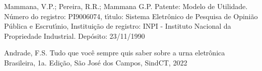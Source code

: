 \documentclass[
12pt,		%
openright,	%
twoside,  %
a4paper,			%
chapter=TITLE,		%
english,			%
french,				%
spanish,			%
brazil				%
]{USPSC-classe/USPSC}
\begin{document}
\begin{flushleft}
\begin{flushleft}
\begin{flushleft}
\begin{flushleft}
\begin{flushleft}
\begin{flushleft}
\begin{flushleft}
\begin{flushleft}
\begin{flushleft}
[MAMMANA et al., 1990] Mammana, V.P.; Pereira, R.R.; Mammana G.P. Patente: Modelo de Utilidade. N\'umero do registro: PI9006074, t\'{\i}tulo: \textquotedbl Sistema Eletr\^onico de Pesquisa de Opini\~ao P\'ublica e Escrut\'{\i}nio\textquotedbl  , Institui\c{c}\~ao de registro: INPI - Instituto Nacional da Propriedade Industrial. Dep\'osito: 23/11/1990
\end{flushleft}


\end{flushleft}


\end{flushleft}


\end{flushleft}


\end{flushleft}


\end{flushleft}


\end{flushleft}


\end{flushleft}


\end{flushleft}


\begin{flushleft}
\begin{flushleft}
\begin{flushleft}
\begin{flushleft}
\begin{flushleft}
\begin{flushleft}
\begin{flushleft}
\begin{flushleft}
\begin{flushleft}
[ANDRADE, 2022] Andrade, F.S. Tudo que voc\^e sempre quis saber sobre a urna eletr\^onica Brasileira, 1a. Edi\c{c}\~ao, S\~ao Jos\'e dos Campos, SindCT, 2022
\end{flushleft}


\end{flushleft}


\end{flushleft}


\end{flushleft}


\end{flushleft}


\end{flushleft}


\end{flushleft}


\end{flushleft}


\end{flushleft}
\end{document}
